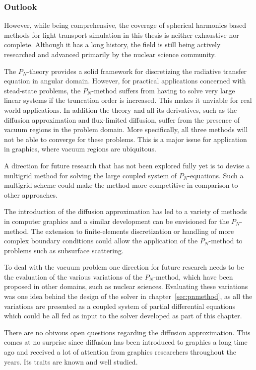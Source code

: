 \subsubsection*{Outlook}

However, while being comprehensive, the coverage of spherical harmonics based methods for light transport simulation in this thesis is neither exhaustive nor complete. Although it has a long history, the field is still being actively researched and advanced primarily by the nuclear science community.

The $P_N$-theory provides a solid framework for discretizing the radiative transfer equation in angular domain. However, for practical applications concerned with stead-state problems, the $P_N$-method suffers from having to solve very large linear systems if the truncation order is increased. This makes it unviable for real world applications. In addition the theory and all its derivatives, such as the diffusion approximation and flux-limited diffusion, suffer from the presence of vacuum regions in the problem domain. More specifically, all three methods will not be able to converge for these problems. This is a major issue for application in graphics, where vacuum regions are ubiquitous.

A direction for future research that has not been explored fully yet is to devise a multigrid method for solving the large coupled system of $P_N$-equations. Such a multigrid scheme could make the method more competitive in comparison to other approaches.

The introduction of the diffusion approximation has led to a variety of methods in computer graphics and a similar development can be envisioned for the $P_N$-method. The extension to finite-elements discretization or handling of more complex boundary conditions could allow the application of the $P_N$-method to problems such as subsurface scattering.

To deal with the vacuum problem one direction for future research needs to be the evaluation of the various variations of the $P_N$-method, which have been proposed in other domains, such as nuclear sciences. Evaluating these variations was one idea behind the design of the solver in chapter~\ref{sec:pnmethod}, as all the variations are presented as a coupled system of partial differential equations which could be all fed as input to the solver developed as part of this chapter.

There are no obivous open questions regarding the diffusion approximation. This comes at no surprise since diffusion has been introduced to graphics a long time ago and received a lot of attention from graphics researchers throughout the years. Its traits are known and well studied.

